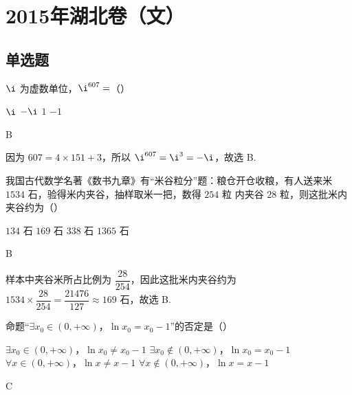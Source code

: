 \chapter{2015年湖北卷（文）}

\section{单选题}

\begin{problem}
\(\i\) 为虚数单位，\(\i^{607}=\)（\quad）

\choices
    {\(\i\)}
    {\(-\i\)}
    {\(1\)}
    {\(-1\)}
\end{problem}

\begin{answer}
B
\end{answer}

\begin{solution}
因为 \(607=4\times151+3\)，所以 \(\i^{607}=\i^3=-\i\)，故选 B.
\end{solution}

\begin{problem}
我国古代数学名著《数书九章》有“米谷粒分”题：粮仓开仓收粮，有人送来米 \(1534\text{ 石}\)，验得米内夹谷，抽样取米一把，数得 \(254\text{ 粒}\) 内夹谷 \(28\text{ 粒}\)，则这批米内夹谷约为（\quad）

\choices
    {\(134\text{ 石}\)}
    {\(169\text{ 石}\)}
    {\(338\text{ 石}\)}
    {\(1365\text{ 石}\)}
\end{problem}

\begin{answer}
B
\end{answer}

\begin{solution}
样本中夹谷米所占比例为 \(\dfrac{28}{254}\)，因此这批米内夹谷约为 \(1534\times\dfrac{28}{254}=\dfrac{21476}{127}\approx169\text{ 石}\)，故选 B.
\end{solution}

\begin{problem}
命题“\(\exists x_0\in (0,+\infty)\)，\(\ln x_0=x_0-1\)”的否定是（\quad）

\choices
    {\(\exists x_0\in (0,+\infty)\)，\(\ln x_0\neq x_0-1\)}
    {\(\exists x_0\notin (0,+\infty)\)，\(\ln x_0=x_0-1\)}
    {\(\forall x\in (0,+\infty)\)，\(\ln x\neq x-1\)}
    {\(\forall x\notin (0,+\infty)\)，\(\ln x=x-1\)}
\end{problem}

\begin{answer}
C
\end{answer}

